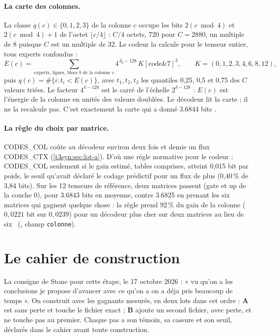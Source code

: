 \paragraph{La carte des colonnes.} La classe $q(c) \in \{0, 1, 2, 3\}$ de la colonne $c$ occupe les bits $2(c \bmod 4)$ et $2(c \bmod 4) + 1$ de l'octet $\lfloor c/4 \rfloor$ : $C/4$ octets, 720 pour $C = 2880$, un multiple de 8 puisque $C$ est un multiple de 32. Le codeur la calcule pour le tenseur entier, tous experts confondus :
\[
E(c) = \sum_{\text{experts, lignes, blocs } b \text{ de la colonne } c} 4^{\,\delta_b - 128}\, K[\mathrm{code} \mathbin{\&} 7]^2, \qquad K = (0, 1, 2, 3, 4, 6, 8, 12),
\]
puis $q(c) = \#\{i : t_i < E(c)\}$, avec $t_1, t_2, t_3$ les quantiles 0,25, 0,5 et 0,75 des $C$ valeurs triées. Le facteur $4^{\delta - 128}$ est le carré de l'échelle $2^{\delta - 128}$ : $E(c)$ est l'énergie de la colonne en unités des valeurs doublées. Le décodeur lit la carte ; il ne la recalcule pas. C'est exactement la carte qui a donné \num{3.6844} bits \mes.

\paragraph{La règle du choix par matrice.} CODES\_COL coûte au décodeur environ deux fois et demie un flux CODES\_CTX (\cref{t3syn:sec:lot-a}). D'où une règle normative pour le codeur : CODES\_COL seulement si le gain estimé, tables comprises, atteint 0,015 bit par poids, le seuil qu'avait déclaré le codage prédictif pour un flux de plus (0,40\,\% de 3,84 bits). Sur les 12 tenseurs de référence, deux matrices passent (gate et up de la couche 0), pour \num{3.6843} bits en moyenne, contre \num{3.6825} en prenant les six matrices qui gagnent quelque chose : la règle prend 92\,\% du gain de la colonne ($0{,}0221$ bit sur $0{,}0239$) pour un décodeur plus cher sur deux matrices au lieu de six \calc~(, champ \texttt{colonne}).

\section{Le cahier de construction}\label{t3syn:sec:cahier}

La consigne de Stone pour cette étape, le 17 octobre 2026 : « vu qu'on a les conclusions je propose d'avancer avec ce qu'on a on a déja pris beaucoup de temps ». On construit avec les gagnants mesurés, en deux lots dans cet ordre : \textbf{A} est sans perte et touche le fichier exact ; \textbf{B} ajoute un second fichier, avec perte, et ne touche pas au premier. Chaque pas a son témoin, sa cassure et son seuil, déclarés dans le cahier avant toute construction.

